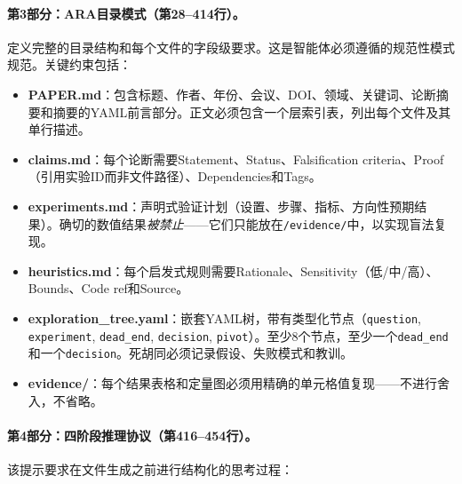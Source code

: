 \paragraph{第3部分：ARA目录模式（第28--414行）。}
定义完整的目录结构和每个文件的字段级要求。这是智能体必须遵循的规范性模式规范。关键约束包括：
\begin{itemize}[leftmargin=*, itemsep=1pt]
    \item \textbf{PAPER.md}：包含标题、作者、年份、会议、DOI、领域、关键词、论断摘要和摘要的YAML前言部分。正文必须包含一个层索引表，列出每个文件及其单行描述。
    \item \textbf{claims.md}：每个论断需要Statement、Status、Falsification criteria、Proof（引用实验ID而非文件路径）、Dependencies和Tags。
    \item \textbf{experiments.md}：声明式验证计划（设置、步骤、指标、方向性预期结果）。确切的数值结果\emph{被禁止}——它们只能放在\texttt{/evidence/}中，以实现盲法复现。
    \item \textbf{heuristics.md}：每个启发式规则需要Rationale、Sensitivity（低/中/高）、Bounds、Code ref和Source。
    \item \textbf{exploration\_tree.yaml}：嵌套YAML树，带有类型化节点（\texttt{question}, \texttt{experiment}, \texttt{dead\_end}, \texttt{decision}, \texttt{pivot}）。至少8个节点，至少一个\texttt{dead\_end}和一个\texttt{decision}。死胡同必须记录假设、失败模式和教训。
    \item \textbf{evidence/}：每个结果表格和定量图必须用精确的单元格值复现——不进行舍入，不省略。
\end{itemize}

\paragraph{第4部分：四阶段推理协议（第416--454行）。}
该提示要求在文件生成之前进行结构化的思考过程：

